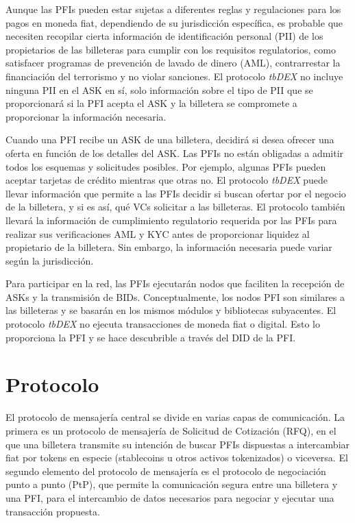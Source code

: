 \documentclass[11pt]{article}
\begin{document}
\vspace{1\baselineskip}
Aunque las PFIs pueden estar sujetas a diferentes reglas y regulaciones para los pagos en moneda fiat, dependiendo de su jurisdicción específica, es probable que necesiten recopilar cierta información de identificación personal (PII) de los propietarios de las billeteras para cumplir con los requisitos regulatorios, como satisfacer programas de prevención de lavado de dinero (AML), contrarrestar la financiación del terrorismo y no violar sanciones. El protocolo \textit{tbDEX} no incluye ninguna PII en el ASK en sí, solo información sobre el tipo de PII que se proporcionará si la PFI acepta el ASK y la billetera se compromete a proporcionar la información necesaria.

\vspace{1\baselineskip}
Cuando una PFI recibe un ASK de una billetera, decidirá si desea ofrecer una oferta en función de los detalles del ASK. Las PFIs no están obligadas a admitir todos los esquemas y solicitudes posibles. Por ejemplo, algunas PFIs pueden aceptar tarjetas de crédito mientras que otras no. El protocolo \textit{tbDEX} puede llevar información que permite a las PFIs decidir si buscan ofertar por el negocio de la billetera, y si es así, qué VCs solicitar a las billeteras. El protocolo también llevará la información de cumplimiento regulatorio requerida por las PFIs para realizar sus verificaciones AML y KYC antes de proporcionar liquidez al propietario de la billetera. Sin embargo, la información necesaria puede variar según la jurisdicción.

\vspace{1\baselineskip}
Para participar en la red, las PFIs ejecutarán nodos que faciliten la recepción de ASKs y la transmisión de BIDs. Conceptualmente, los nodos PFI son similares a las billeteras y se basarán en los mismos módulos y bibliotecas subyacentes. El protocolo \textit{tbDEX} no ejecuta transacciones de moneda fiat o digital. Esto lo proporciona la PFI y se hace descubrible a través del DID de la PFI.

\vspace{1\baselineskip}
\section{Protocolo}

\vspace{1\baselineskip}
El protocolo de mensajería central se divide en varias capas de comunicación. La primera es un protocolo de mensajería de Solicitud de Cotización (RFQ), en el que una billetera transmite su intención de buscar PFIs dispuestas a intercambiar fiat por tokens en especie (stablecoins u otros activos tokenizados) o viceversa. El segundo elemento del protocolo de mensajería es el protocolo de negociación punto a punto (PtP), que permite la comunicación segura entre una billetera y una PFI, para el intercambio de datos necesarios para negociar y ejecutar una transacción propuesta.
\end{document}
